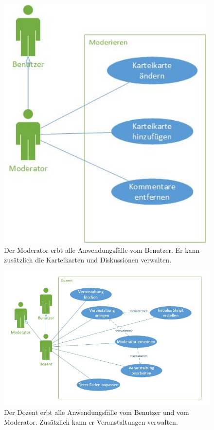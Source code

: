 \documentclass[12pt,a4paper]{article}
\begin{document}
\begin{figure}[H]
	\centering
	\includegraphics[height=13cm]{Bilder/Anwendungsfalldiagramme/Moderator.jpg}
	\caption{Der Moderator erbt alle Anwendungsfälle vom Benutzer. Er kann zusätzlich die Karteikarten und Diskussionen verwalten.}
	\label{AwfModerator}
\end{figure}

\begin{figure}[H]
	\centering
	\includegraphics[width=\textwidth]{Bilder/Anwendungsfalldiagramme/abbildung3.jpg}
	\caption{Der Dozent erbt alle Anwendungsfälle vom Benutzer und vom Moderator. Zusätzlich kann er Veranstaltungen verwalten.}
	\label{AwfDozent}
\end{figure}
\end{document}
